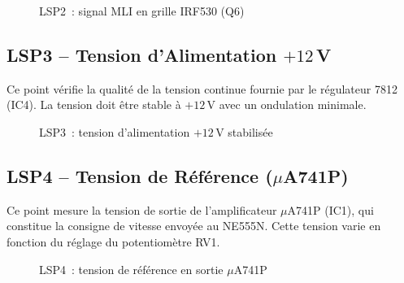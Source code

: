 \documentclass[a4paper,12pt,openany]{book}
\begin{document}
\begin{figure}[H]
  \centering
  \caption{LSP2~: signal MLI en grille IRF530 (Q6)}
  \label{fig:lsp2}
\end{figure}

\subsection{LSP3 -- Tension d'Alimentation $+12$\,V}

Ce point v\'erifie la qualit\'e de la tension continue fournie par le
r\'egulateur 7812 (IC4). La tension doit \^etre stable \`a $+12$\,V avec
un ondulation minimale.

\begin{figure}[H]
  \centering
  \caption{LSP3~: tension d'alimentation $+12$\,V stabilis\'ee}
  \label{fig:lsp3}
\end{figure}

\subsection{LSP4 -- Tension de R\'ef\'erence ($\mu$A741P)}

Ce point mesure la tension de sortie de l'amplificateur $\mu$A741P (IC1),
qui constitue la consigne de vitesse envoy\'ee au NE555N. Cette tension
varie en fonction du r\'eglage du potentiom\`etre RV1.

\begin{figure}[H]
  \centering
  \caption{LSP4~: tension de r\'ef\'erence en sortie $\mu$A741P}
  \label{fig:lsp4}
\end{figure}
\end{document}

